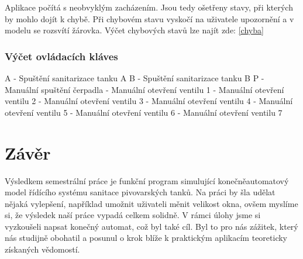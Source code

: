\documentclass[12pt, a4paper]{article}
\begin{document}
Aplikace počítá s neobvyklým zacházením. Jsou tedy ošetřeny stavy, při kterých by mohlo dojít k chybě. Při chybovém stavu vyskočí na uživatele upozornění a v modelu se rozsvítí žárovka. Výčet chybových stavů lze najít zde: \ref{chyba}

\subsubsection{Výčet ovládacích kláves} \label{ovladani}
A - Spuštění sanitarizace tanku A \newline 
B - Spuštění sanitarizace tanku B \newline 
P - Manuální spuštění čerpadla  - Manuální otevření ventilu 1  - Manuální otevření ventilu 2  - Manuální otevření ventilu 3  - Manuální otevření ventilu 4  - Manuální otevření ventilu 5  - Manuální otevření ventilu 6  - Manuální otevření ventilu 7 \newline 

\section{Závěr}
Výsledkem semestrální práce je funkční program simulující konečněautomatový model řídícího systému sanitace pivovarských tanků. Na práci by šla udělat nějaká vylepšení, například umožnit uživateli měnit velikost okna, ovšem myslíme si, že výsledek naší práce vypadá celkem solidně. V rámci úlohy jsme si vyzkoušeli napsat konečný automat, což byl také cíl. Byl to pro nás zážitek, který nás studijně obohatil a posunul o krok blíže k praktickým aplikacím teoreticky získaných vědomostí. 

\nocite{wiki:Konecny_automat}

\listoffigures



\end{document}
